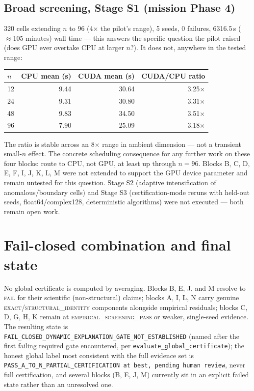 \documentclass[11pt]{amsart}
\begin{document}
\subsection{Broad screening, Stage S1 (mission Phase 4)}
320 cells extending $n$ to 96 (4$\times$ the pilot's range), 5 seeds, 0
failures, 6316.5\,s ($\approx 105$ minutes) wall time --- this answers
the specific question the pilot raised (does GPU ever overtake CPU at
larger $n$?). It does not, anywhere in the tested range:

\begin{center}
\small
\begin{tabular}{lrrr}
\toprule
$n$ & CPU mean (s) & CUDA mean (s) & CUDA/CPU ratio \\
\midrule
12 & 9.44 & 30.64 & 3.25$\times$ \\
24 & 9.31 & 30.80 & 3.31$\times$ \\
48 & 9.83 & 34.50 & 3.51$\times$ \\
96 & 7.90 & 25.09 & 3.18$\times$ \\
\bottomrule
\end{tabular}
\end{center}

The ratio is stable across an 8$\times$ range in ambient dimension ---
not a transient small-$n$ effect. The concrete scheduling consequence for
any further work on these four blocks: route to CPU, not GPU, at least up
through $n=96$. Blocks B, C, D, E, F, I, J, K, L, M were not extended to
support the GPU device parameter and remain untested for this question.
Stage S2 (adaptive intensification of anomalous/boundary cells) and Stage
S3 (certification-mode reruns with held-out seeds, float64/complex128,
deterministic algorithms) were not executed --- both remain open work.

\section{Fail-closed combination and final state}
\label{sec:final}

No global certificate is computed by averaging. Blocks B, E, J, and M
resolve to \textsc{fail} for their scientific (non-structural) claims;
blocks A, I, L, N carry genuine \textsc{exact}/\textsc{structural\_identity}
components alongside empirical residuals; blocks C, D, G, H, K remain at
\textsc{empirical\_screening\_pass} or weaker, single-seed evidence. The
resulting state is \texttt{FAIL\_CLOSED\_DYNAMIC\_EXPLANATION\_GATE\_NOT\_ESTABLISHED}
(named after the first failing required gate encountered, per
\texttt{evaluate\_global\_certificate}); the honest global label most
consistent with the full evidence set is
\texttt{PASS\_A\_TO\_N\_PARTIAL\_CERTIFICATION at best, pending human review},
never full certification, and several blocks (B, E, J, M) currently sit
in an explicit failed state rather than an unresolved one.
\end{document}
